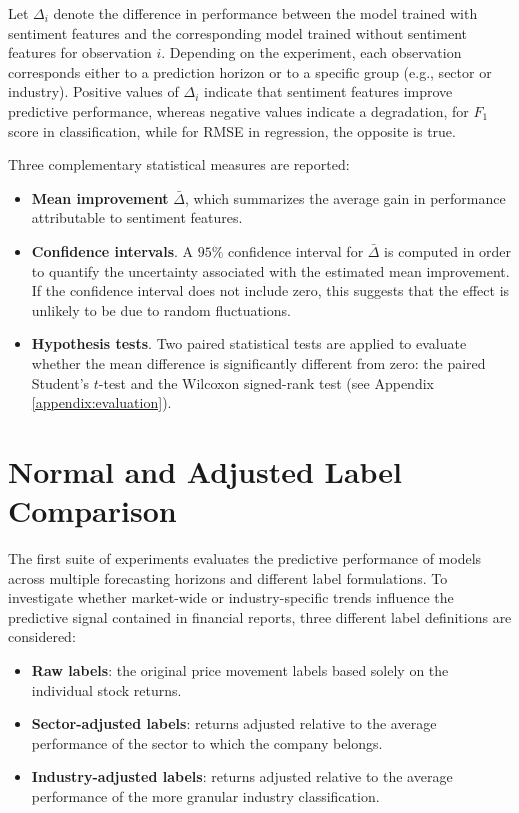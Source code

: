 Let $\Delta_i$ denote the difference in performance between the model trained with sentiment features and the corresponding model trained without sentiment features for observation $i$. 
Depending on the experiment, each observation corresponds either to a prediction horizon or to a specific group (e.g., sector or industry). 
Positive values of $\Delta_i$ indicate that sentiment features improve predictive performance, whereas negative values indicate a degradation, for $F_1$ score in classification, while for RMSE in regression, the opposite is true.

Three complementary statistical measures are reported:

\begin{itemize}
    \item \textbf{Mean improvement} $\bar{\Delta}$, which summarizes the average gain in performance attributable to sentiment features.
    
    \item \textbf{Confidence intervals}. A $95\%$ confidence interval for $\bar{\Delta}$ is computed in order to quantify the uncertainty associated with the estimated mean improvement. If the confidence interval does not include zero, this suggests that the effect is unlikely to be due to random fluctuations.
    
    \item \textbf{Hypothesis tests}. Two paired statistical tests are applied to evaluate whether the mean difference is significantly different from zero: the paired Student's $t$-test and the Wilcoxon signed-rank test (see Appendix \ref{appendix:evaluation}).
\end{itemize}

\section{Normal and Adjusted Label Comparison}

The first suite of experiments evaluates the predictive performance of models across multiple forecasting horizons and different label formulations.
To investigate whether market-wide or industry-specific trends influence the predictive signal contained in financial reports, three different label definitions are considered:

\begin{itemize}
\item \textbf{Raw labels}: the original price movement labels based solely on the individual stock returns.
\item \textbf{Sector-adjusted labels}: returns adjusted relative to the average performance of the sector to which the company belongs.
\item \textbf{Industry-adjusted labels}: returns adjusted relative to the average performance of the more granular industry classification.
\end{itemize}

